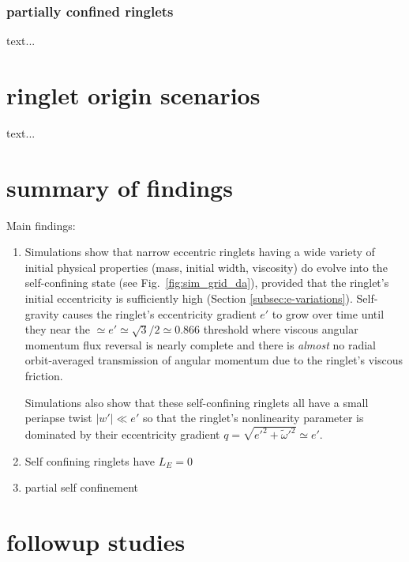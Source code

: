 \documentclass[preprint]{aastex62}
\begin{document}
\subsubsection{partially confined ringlets}
\label{subsec:partially_confined}

text...

\section{ringlet origin scenarios}
\label{sec:origin}

text...

\section{summary of findings}
\label{sec:summary}

Main findings:

\begin{enumerate}

\item Simulations show that narrow eccentric ringlets having a wide variety of initial 
physical properties (mass, initial width, viscosity) do evolve
into the self-confining state (see Fig.\ \ref{fig:sim_grid_da}), 
provided that the ringlet's initial eccentricity is sufficiently high (Section \ref{subsec:e-variations}). 
Self-gravity causes the ringlet's eccentricity gradient $e'$ to grow over time until they near the
$\simeq e'\simeq\sqrt{3}/2\simeq0.866$ threshold where viscous angular momentum flux
reversal is nearly complete and there is {\em almost} no radial orbit-averaged
transmission of angular momentum due to the ringlet's viscous friction.

Simulations also show that these self-confining ringlets all have a small 
periapse twist $|w'|\ll e'$ so that the
ringlet's nonlinearity parameter is dominated by their eccentricity gradient
$q=\sqrt{e'^2 + \tilde{\omega}'^2}\simeq e'$.

\item Self confining ringlets have $L_E=0$

\item partial self confinement

\end{enumerate}


\section{followup studies}
\label{sec:followup}
\end{document}
